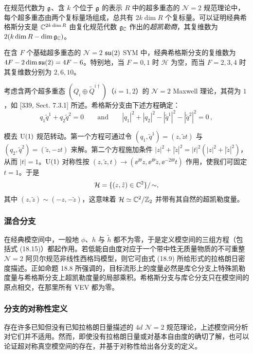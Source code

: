 在规范代数为 $\mathfrak{g}$、含 $k$ 个位于 $\mathfrak{g}$ 的表示 $R$ 中的超多重态的 $\mathcal N=2$ 规范理论中，每个超多重态由两个复标量场组成，总共有 $2k\dim R$ 个复标量。可以证明经典希格斯分支是 $\mathbb{C}^{2k\dim R}$ 由复化规范代数 $\mathfrak{g}_{\mathbb{C}}$ 作出的\emph{超凯勒商}，其复维数为 $2(k\dim R-\dim\mathfrak{g}_{\mathbb{C}})$。

\begin{example}[18.15]
在含 $F$ 个基础超多重态的 $\mathcal N=2$ $\mathfrak{su}(2)$ SYM 中，经典希格斯分支的复维数为 $4F-2\dim\mathfrak{su}(2)=4F-6$。特别地，当 $F=0,1$ 时 $\mathcal H$ 为空，而当 $F=2,3,4$ 时其复维数分别为 $2,6,10$。
\end{example}

\begin{example}[18.16]
考虑含两个超多重态 $(Q_i\oplus\tilde Q^{i\dagger})$（$i=1,2$）的 $\mathcal N=2$ Maxwell 理论，其荷为 $1$，如 [339, Sect. 7.3.1] 所述。希格斯分支由下述方程确定：
\[
q_1\tilde q^1+q_2\tilde q^2=0
\qquad\text{and}\qquad
|q_1|^2+|q_2|^2-|\tilde q^1|^2-|\tilde q^2|^2=0\,,
\]
\end{example}

模去 $\operatorname{U}(1)$ 规范转动。第一个方程可通过令 $(q_1,\tilde q^1)=(z,\tilde zt)$ 与 $(q_2,\tilde q^2)=(\tilde z,-zt)$ 来解。第二个方程施加条件 $|z|^2+|\tilde z|^2=|t|^2(|z|^2+|\tilde z|^2)$，从而 $|t|=1$。$\operatorname{U}(1)$ 对称性按 $(z,\tilde z,t)\to(\ee^{\ii\theta}z,\ee^{\ii\theta}\tilde z,\ee^{-2\ii\theta}t)$ 作用，使我们可固定 $t=1$。于是
\[
\mathcal H=\{(z,\tilde z)\in\mathbb{C}^2\}/\!\sim,
\]
其中 $(z,\tilde z)\sim(-z,-\tilde z)$，这意味着 $\mathcal H\simeq\mathbb{C}^2/\mathbb{Z}_2$ 并带有其自然的超凯勒度量。

\subsubsection*{混合分支}

在经典模空间中，一般地 $\phi$、$h$ 与 $\tilde h$ 都不为零，于是定义模空间的三组方程（包括式 (18.15)）都起作用。若低能自由度对应于一个带中性无质量物质的不可重整 $\mathcal N=2$ 阿贝尔规范非线性西格玛模型，则它可由式 (18.9) 所给形式的拉格朗日密度描述。正如命题 18.8 所强调的，目标流形上的度量必然是库仑分支上特殊凯勒度量与希格斯分支上超凯勒度量的局部乘积。希格斯分支与库仑分支只在模空间的原点相交，在那里所有 VEV 都为零。

\subsubsection*{分支的对称性定义}

存在许多已知但没有已知拉格朗日量描述的 $4d$ $\mathcal N=2$ 规范理论，上述模空间分析对它们并不适用。然而，即使没有拉格朗日量或对基本自由度的确切了解，也可以论证超对称真空模空间的存在，并基于对称性给出各分支的定义。

